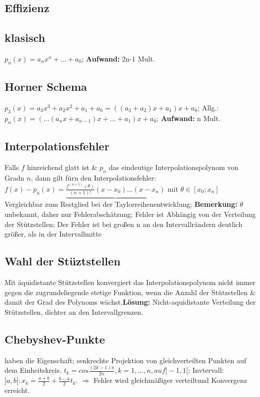 \subsection{Effizienz}
\subsection{klasisch}
$ p_{n} (x) = a_{n} x^{n} + ... + a_{0} $; 
\textbf{Aufwand:} 2n-1 Mult.
\subsection{Horner Schema}
$ p_{3} (x) = a_{3} x^{3} + a_{2} x^{2} + a_{1} + a_{0} = (( a_{3} + a_{2} ) x + a_{1} )x+ a_{0} $; 
Allg.: $ p_{n} (x) = ( ... ( a_{n} x + a_{n-1} ) x + ... + a_{1} ) x + a_{0} $; 
\textbf{Aufwand:} n Mult.

\subsection{Interpolationsfehler}
Falls $ f $ hinreichend glatt ist \& $ p_{n} $ das eindeutige Interpolationspolynom von Gradn $ n $, dann gilt fürn den Interpolationsfehler:
$ f(x) - p_{n}(x) = \underbrace{ \frac{ f^{ ( n+1 ) }( \theta ) }{ ( n+1) ! } ( x-x_{0} )...( x-x_{n} ) } $ mit $ \theta \in [ x_{0}; x_{n} ]  $\\
Vergleichbar zum Restglied bei der Taylorreihenentwicklung; 
\textbf{Bemerkung:} $ \theta $ unbekannt, daher nur Fehlerabschätzung; 
Fehler ist Abhängig von der Verteilung der Stützstellen; 
Der Fehler ist bei großen n an den Intervallrändern deutlich größer, als in der Intervallmitte
\subsection{Wahl der Stüztstellen}
Mit äquidistante Stützstellen konvergiert das Interpolationspolynom nicht immer gegen die zugrundeliegende stetige Funktion, wenn die Anzahl der Stützstellen \& damit der Grad des Polynoms wächst.\textbf{Lösung:}  Nicht-aquidistante Verteilung der Stützstellen, dichter an den Intervallgrenzen.
\subsection{Chebyshev-Punkte}
haben die Eigenschaft; senkrechte Projektion von gleichverteilten Punkten auf dem Einheitskreis. $ t_{k} = cos\frac{ ( 2k-1 ) \pi }{ 2n }, k=1,...,n, auf ]-1,1[ $;  Invtervall: $ ]a,b[: x_{k} = \frac{ a +b }{2} + \frac{ b-a }{ 2 } t_{k} $. $\Rightarrow$ Fehler wird gleichmäßiger verteiltund Konvergenz erreicht.

